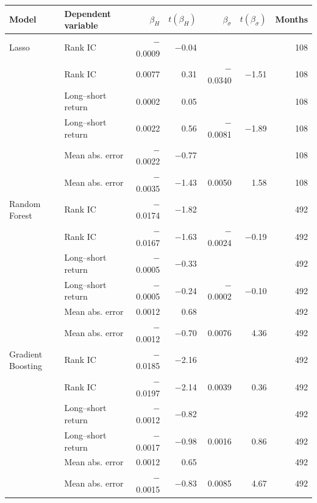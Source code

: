 \begin{tabular}{llrrrrr}
\toprule
Model & Dependent variable & $\beta_H$ & $t(\beta_H)$ & $\beta_{\sigma}$ & $t(\beta_{\sigma})$ & Months \\
\midrule
Lasso & Rank IC & $-$0.0009 & $-$0.04 &  &  & 108 \\
 & Rank IC & 0.0077 & 0.31 & $-$0.0340 & $-$1.51 & 108 \\
 & Long--short return & 0.0002 & 0.05 &  &  & 108 \\
 & Long--short return & 0.0022 & 0.56 & $-$0.0081 & $-$1.89 & 108 \\
 & Mean abs. error & $-$0.0022 & $-$0.77 &  &  & 108 \\
 & Mean abs. error & $-$0.0035 & $-$1.43 & 0.0050 & 1.58 & 108 \\
\midrule
Random Forest & Rank IC & $-$0.0174 & $-$1.82 &  &  & 492 \\
 & Rank IC & $-$0.0167 & $-$1.63 & $-$0.0024 & $-$0.19 & 492 \\
 & Long--short return & $-$0.0005 & $-$0.33 &  &  & 492 \\
 & Long--short return & $-$0.0005 & $-$0.24 & $-$0.0002 & $-$0.10 & 492 \\
 & Mean abs. error & 0.0012 & 0.68 &  &  & 492 \\
 & Mean abs. error & $-$0.0012 & $-$0.70 & 0.0076 & 4.36 & 492 \\
\midrule
Gradient Boosting & Rank IC & $-$0.0185 & $-$2.16 &  &  & 492 \\
 & Rank IC & $-$0.0197 & $-$2.14 & 0.0039 & 0.36 & 492 \\
 & Long--short return & $-$0.0012 & $-$0.82 &  &  & 492 \\
 & Long--short return & $-$0.0017 & $-$0.98 & 0.0016 & 0.86 & 492 \\
 & Mean abs. error & 0.0012 & 0.65 &  &  & 492 \\
 & Mean abs. error & $-$0.0015 & $-$0.83 & 0.0085 & 4.67 & 492 \\
\bottomrule
\end{tabular}